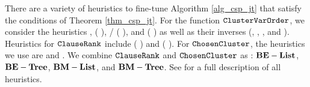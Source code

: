 There are a variety of heuristics to fine-tune Algorithm \ref{alg_csp_jt} that satisfy the conditions of Theorem \ref{thm_csp_jt}.
For the function $\texttt{\upshape ClusterVarOrder}$, we consider the heuristics \Random, \Mcs{} ( \cite{tarjan1984simple}), \Lexp/\Lexm{} ( \cite{koster2001treewidth}), and \Minfill{} ( \cite{dechter03}) as well as their inverses (\Invmcs, \Invlexp, \Invlexm, and \Invminfill).
Heuristics for $\texttt{\upshape ClauseRank}$ include \Be{} ( \cite{dechter99}) and \Bm{} ( \cite{bouquet1999gestion}).
For $\texttt{\upshape ChosenCluster}$, the heuristics we use are \ListH{} and \TreeH{} \cite{DPV20}.
We combine $\texttt{\upshape ClauseRank}$ and $\texttt{\upshape ChosenCluster}$ as : $\textbf{BE}-\textbf{List}$, $\textbf{BE}-\textbf{Tree}$, $\textbf{BM}-\textbf{List}$, and $\textbf{BM}-\textbf{Tree}$. See \cite{dudek2020dpmc} for a full description of all heuristics.

